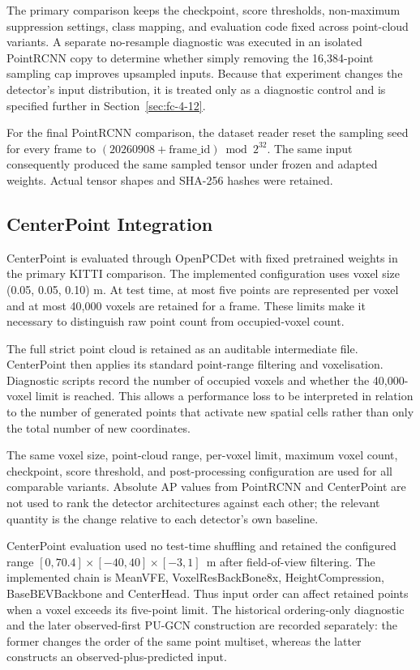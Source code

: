 The primary comparison keeps the checkpoint, score thresholds, non-maximum suppression settings, class mapping, and evaluation code fixed across point-cloud variants. A separate no-resample diagnostic was executed in an isolated PointRCNN copy to determine whether simply removing the 16,384-point sampling cap improves upsampled inputs. Because that experiment changes the detector's input distribution, it is treated only as a diagnostic control and is specified further in Section~\ref{sec:fc-4-12}.

For the final PointRCNN comparison, the dataset reader reset the sampling
seed for every frame to $(20260908+\mathrm{frame\_id})\bmod2^{32}$.
The same input consequently produced the same sampled tensor under frozen
and adapted weights. Actual tensor shapes and SHA-256 hashes were retained.

\subsection{CenterPoint Integration}
\label{sec:fc-4-8-2}

CenterPoint \cite{yin2021centerpoint} is evaluated through OpenPCDet \cite{openpcdet2020} with fixed pretrained weights in the primary KITTI comparison. The implemented configuration uses voxel size (0.05, 0.05, 0.10) m. At test time, at most five points are represented per voxel and at most 40,000 voxels are retained for a frame. These limits make it necessary to distinguish raw point count from occupied-voxel count.

The full strict point cloud is retained as an auditable intermediate file. CenterPoint then applies its standard point-range filtering and voxelisation. Diagnostic scripts record the number of occupied voxels and whether the 40,000-voxel limit is reached. This allows a performance loss to be interpreted in relation to the number of generated points that activate new spatial cells rather than only the total number of new coordinates.

The same voxel size, point-cloud range, per-voxel limit, maximum voxel count, checkpoint, score threshold, and post-processing configuration are used for all comparable variants. Absolute AP values from PointRCNN and CenterPoint are not used to rank the detector architectures against each other; the relevant quantity is the change relative to each detector's own baseline.

CenterPoint evaluation used no test-time shuffling and retained the
configured range $[0,70.4]\times[-40,40]\times[-3,1]$~m after
field-of-view filtering. The implemented chain is MeanVFE,
VoxelResBackBone8x, HeightCompression, BaseBEVBackbone and CenterHead.
Thus input order can affect retained points when a voxel exceeds its
five-point limit. The historical ordering-only diagnostic and the
later observed-first PU-GCN construction are recorded separately:
the former changes the order of the same point multiset, whereas the
latter constructs an observed-plus-predicted input.

